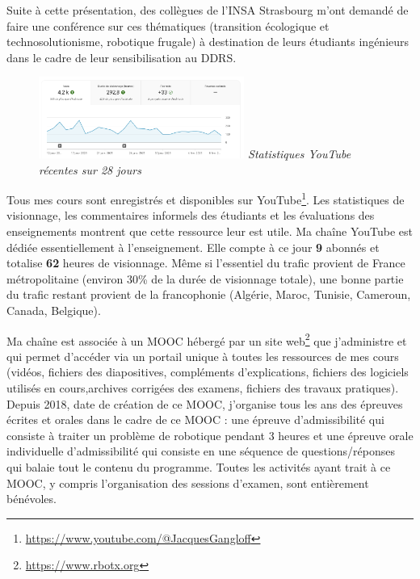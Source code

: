 \documentclass[a4paper,12pt]{article}
\begin{document}
Suite à cette présentation, des collègues de l'INSA Strasbourg m'ont demandé de faire une conférence sur ces thématiques (transition écologique et technosolutionisme, robotique frugale) à destination de leurs étudiants ingénieurs dans le cadre de leur sensibilisation au DDRS.

\begin{figure}
\centering
\vskip-4mm
\includegraphics[width=0.6\textwidth]{YouTube.png}
{\em Statistiques YouTube récentes sur 28 jours}\vskip-4mm
\end{figure}
Tous mes cours sont enregistrés et disponibles sur YouTube\footnote{\url{https://www.youtube.com/@JacquesGangloff}}. Les statistiques de visionnage, les commentaires informels des étudiants et les évaluations des enseignements montrent que cette ressource leur est utile. Ma chaîne YouTube est dédiée essentiellement à l’enseignement. Elle compte à ce jour {\bf 9} abonnés et totalise {\bf 62} heures de visionnage. Même si l'essentiel du trafic provient de France métropolitaine (environ 30\% de la durée de visionnage totale), une bonne partie du trafic restant provient de la francophonie (Algérie, Maroc, Tunisie, Cameroun, Canada, Belgique).

Ma chaîne est associée à un MOOC hébergé par un site web\footnote{\url{https://www.rbotx.org}} que j’administre et qui permet d’accéder via un portail unique à toutes les ressources de mes cours (vidéos, fichiers des diapositives, compléments d’explications, fichiers des logiciels utilisés en cours,archives corrigées des examens, fichiers des travaux pratiques). Depuis 2018, date de création de ce MOOC, j'organise tous les ans des épreuves écrites et orales dans le cadre de ce MOOC : une épreuve d'admissibilité qui consiste à traiter un problème de robotique pendant 3 heures et une épreuve orale individuelle d'admissibilité qui consiste en une séquence de questions/réponses qui balaie tout le contenu du programme. Toutes les activités ayant trait à ce MOOC, y compris l’organisation des sessions d’examen, sont entièrement bénévoles.
\end{document}
